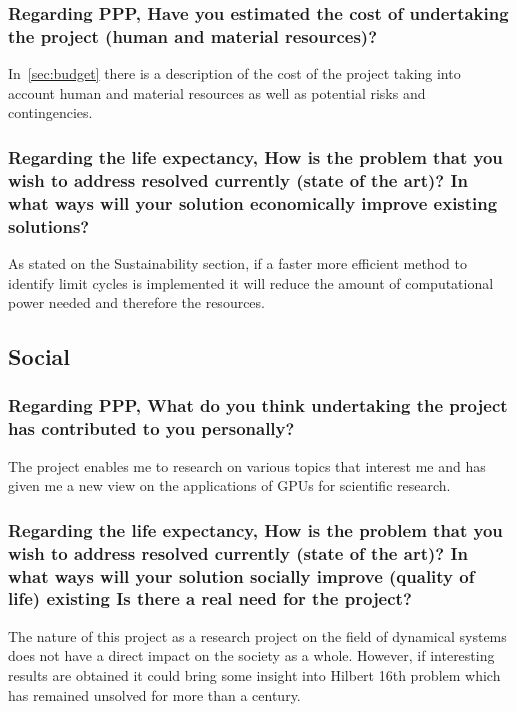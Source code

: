 \subsubsection*{Regarding PPP, Have you estimated the cost of undertaking the
project (human and material resources)?}

In~\cref{sec:budget} there is a description of the cost of the project taking
into account human and material resources as well as potential risks and
contingencies.

\subsubsection*{Regarding the life expectancy, How is the problem that you wish
to address resolved currently (state of the art)? In what ways will your
solution economically improve existing solutions?}

As stated on the Sustainability section, if a faster more efficient method to
identify limit cycles is implemented it will reduce the amount of computational
power needed and therefore the resources.


\subsection{Social}

\subsubsection*{Regarding PPP, What do you think undertaking the project has
contributed to you personally?}

The project enables me to research on various topics that interest me and has
given me a new view on the applications of GPUs for scientific research.

\subsubsection*{Regarding the life expectancy, How is the problem that you wish
to address resolved currently (state of the art)? In what ways will your
solution socially improve (quality of life) existing Is there a real need for
the project?}

The nature of this project as a research project on the field of dynamical
systems does not have a direct impact on the society as a whole. However, if
interesting results are obtained it could bring some insight into Hilbert 16th
problem which has remained unsolved for more than a century.
